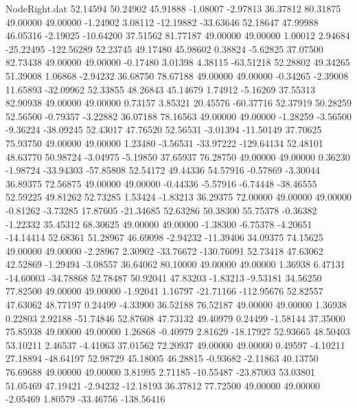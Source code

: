 \begin{filecontents}{NodeRight.dat}
  52.14594   50.24902   45.91888    -1.08007   -2.97813   36.37812   80.31875   49.00000   49.00000   -1.24902    3.08112  -12.19882  -33.63646
  52.18647   47.99988   46.05316    -2.19025  -10.64200   37.51562   81.77187   49.00000   49.00000    1.00012    2.94684  -25.22495 -122.56289
  52.23745   49.17480   45.98602     0.38824   -5.62825   37.07500   82.73438   49.00000   49.00000   -0.17480    3.01398    4.38115  -63.51218
  52.28802   49.34265   51.39008     1.06868   -2.94232   36.68750   78.67188   49.00000   49.00000   -0.34265   -2.39008   11.65893  -32.09962
  52.33855   48.26843   45.14679     1.74912   -5.16269   37.55313   82.90938   49.00000   49.00000    0.73157    3.85321   20.45576  -60.37716
  52.37919   50.28259   52.56500    -0.79357   -3.22882   36.07188   78.16563   49.00000   49.00000   -1.28259   -3.56500   -9.36224  -38.09245
  52.43017   47.76520   52.56531    -3.01394  -11.50149   37.70625   75.93750   49.00000   49.00000    1.23480   -3.56531  -33.97222 -129.64134
  52.48101   48.63770   50.98724    -3.04975   -5.19850   37.65937   76.28750   49.00000   49.00000    0.36230   -1.98724  -33.94303  -57.85808
  52.54172   49.44336   54.57916    -0.57869   -3.30044   36.89375   72.56875   49.00000   49.00000   -0.44336   -5.57916   -6.74448  -38.46555
  52.59225   49.81262   52.73285     1.53424   -1.83213   36.29375   72.00000   49.00000   49.00000   -0.81262   -3.73285   17.87605  -21.34685
  52.63286   50.38300   55.75378    -0.36382   -1.22332   35.45312   68.30625   49.00000   49.00000   -1.38300   -6.75378   -4.20651  -14.14414
  52.68361   51.28967   46.69098    -2.94232  -11.39406   34.09375   74.15625   49.00000   49.00000   -2.28967    2.30902  -33.76672 -130.76091
  52.73418   47.63062   42.52869    -1.29494   -3.08557   36.64062   80.10000   49.00000   49.00000    1.36938    6.47131  -14.60003  -34.78868
  52.78487   50.92041   47.83203    -1.83213   -9.53181   34.56250   77.82500   49.00000   49.00000   -1.92041    1.16797  -21.71166 -112.95676
  52.82557   47.63062   48.77197     0.24499   -4.33900   36.52188   76.52187   49.00000   49.00000    1.36938    0.22803    2.92188  -51.74846
  52.87608   47.73132   49.40979     0.24499   -1.58144   37.35000   75.85938   49.00000   49.00000    1.26868   -0.40979    2.81629  -18.17927
  52.93665   48.50403   53.10211     2.46537   -4.41063   37.01562   72.20937   49.00000   49.00000    0.49597   -4.10211   27.18894  -48.64197
  52.98729   45.18005   46.28815    -0.93682   -2.11863   40.13750   76.69688   49.00000   49.00000    3.81995    2.71185  -10.55487  -23.87003
  53.03801   51.05469   47.19421    -2.94232  -12.18193   36.37812   77.72500   49.00000   49.00000   -2.05469    1.80579  -33.46756 -138.56416

\end{filecontents}
